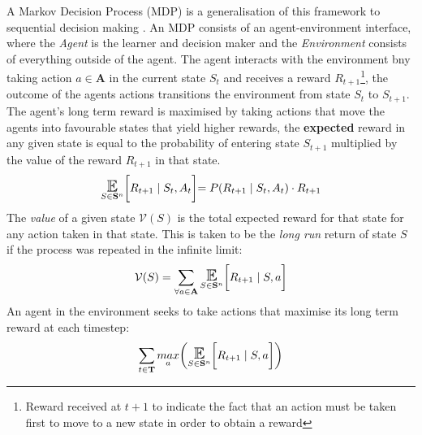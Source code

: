 \begin{center}
\end{center}
A Markov Decision Process (MDP) is a generalisation of this framework to sequential
decision making \cite{sutton2018reinforcement}. An MDP consists of an agent-environment
interface, where the \emph{Agent} is the learner and decision maker and the \emph{Environment}
consists of everything outside of the agent. The agent interacts with the environment
bny taking action $a \in \mathbf{A}$ in the current state $S_t$ and receives a reward $R_{t+1}$\footnote{Reward received at $t+1$ to indicate the fact that 
an action must be taken first to move to a new state in order to obtain a reward}, the outcome of the agents actions
transitions the environment from state $S_t$ to $S_{t+1}$.
The agent's long term reward is maximised by taking actions that move the agents into 
favourable states that yield higher rewards, the \textbf{expected} reward in any given state
is equal to the probability of entering state $S_{t+1}$ multiplied by the value of the reward $R_{t+1}$ in that state.
\begin{equation}
    {\displaystyle \E_{S \in \mathbf{S}^n}\biggl[R_{t+1} \; | \; S_t, A_t \biggl] = 
    P(R_{t+1}\; | \; S_t, A_t)\cdot R_{t+1}}
\end{equation}
The \emph{value} of a given state $\mathcal{V}(S)$ is the total expected reward for that state for any action taken in that state.
This is taken to be the \emph{long run} return of state $S$ if the process was repeated in the infinite limit:
\begin{equation}
    { \displaystyle \mathcal{V}(S) = \sum_{\forall a \in \mathbf{A}} \E_{S \in \mathbf{S}^n}\biggl[R_{t+1} \; | \; S, a \biggl]}
\end{equation}
An agent in the environment seeks to take actions that maximise its long term reward at each timestep:
\begin{equation}
    \sum_{t \in \mathbf{T}}\underset{a}{max}\biggl(\E_{S \in \mathbf{S}^n}\biggl[R_{t+1} \; | \; S, a \biggl]\biggl)
\end{equation}
